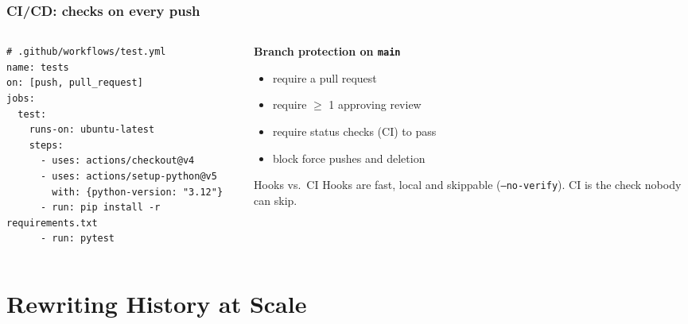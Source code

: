 \documentclass[aspectratio=169,10pt,compress]{beamer}
\begin{document}
\begin{frame}[t,fragile] \frametitle{CI/CD: checks on every push}
  \begin{columns}[T]
    \begin{column}{0.52\textwidth}
\begin{lstlisting}[language={}]
# .github/workflows/test.yml
name: tests
on: [push, pull_request]
jobs:
  test:
    runs-on: ubuntu-latest
    steps:
      - uses: actions/checkout@v4
      - uses: actions/setup-python@v5
        with: {python-version: "3.12"}
      - run: pip install -r requirements.txt
      - run: pytest
\end{lstlisting}
    \end{column}
    \begin{column}{0.45\textwidth}
      \textbf{Branch protection on \texttt{main}}
      \begin{itemize}\small
        \item require a pull request
        \item require $\ge$ 1 approving review
        \item require status checks (CI) to pass
        \item block force pushes and deletion
      \end{itemize}
      \vspace{0.3em}
      \begin{block}{Hooks vs.\ CI}
        \small Hooks are fast, local and skippable (\texttt{--no-verify}).
        CI is the check nobody can skip.
      \end{block}
    \end{column}
  \end{columns}
\end{frame}

\section[Rewrite]{Rewriting History at Scale}
\end{document}
